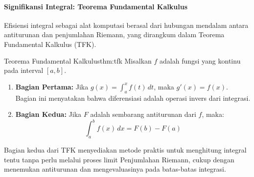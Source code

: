 \documentclass[12pt, a4paper]{article}
\begin{document}
\paragraph{Signifikansi Integral: Teorema Fundamental Kalkulus}
Efisiensi integral sebagai alat komputasi berasal dari hubungan mendalam antara antiturunan dan penjumlahan Riemann, yang dirangkum dalam Teorema Fundamental Kalkulus (TFK).
\begin{theorem}{Teorema Fundamental Kalkulus}{thm:tfk}
Misalkan $f$ adalah fungsi yang kontinu pada interval $[a,b]$.
\begin{enumerate}
    \item \textbf{Bagian Pertama:} Jika $g(x) = \int_{a}^{x} f(t) \,dt$, maka $g'(x) = f(x)$. Bagian ini menyatakan bahwa diferensiasi adalah operasi invers dari integrasi.
    \item \textbf{Bagian Kedua:} Jika $F$ adalah sembarang antiturunan dari $f$, maka:
    \[
    \int_{a}^{b} f(x) \,dx = F(b) - F(a)
    \]
\end{enumerate}
\end{theorem}
Bagian kedua dari TFK menyediakan metode praktis untuk menghitung integral tentu tanpa perlu melalui proses limit Penjumlahan Riemann, cukup dengan menemukan antiturunan dan mengevaluasinya pada batas-batas integrasi.
\end{document}
